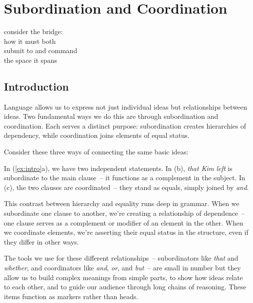 \chapter{Subordination and Coordination} \label{ch:subord-coord}

\epigraph{consider the bridge:\\
how it must both\\
submit to and command\\
the space it spans}{}

\section{Introduction}

Language allows us to express not just individual ideas but relationships between ideas. Two fundamental ways we do this are through subordination and coordination. Each serves a distinct purpose: subordination creates hierarchies of dependency, while coordination joins elements of equal status.

Consider these three ways of connecting the same basic ideas:

\ea \label{ex:intro}
    \z
\z

In (\ref{ex:intro}a), we have two independent statements. In (b), \textit{that Kim left} is subordinate to the main clause~-- it functions as a complement in the subject. In (c), the two clauses are coordinated~-- they stand as equals, simply joined by \textit{and}.

This contrast between hierarchy and equality runs deep in grammar. When we subordinate one clause to another, we're creating a relationship of dependence~-- one clause serves as a complement or modifier of an element in the other. When we coordinate elements, we're asserting their equal status in the structure, even if they differ in other ways.

The tools we use for these different relationships~-- subordinators like \textit{that} and \textit{whether}, and coordinators like \textit{and}, \textit{or}, and \textit{but}~-- are small in number but they allow us to build complex meanings from simple parts, to show how ideas relate to each other, and to guide our audience through long chains of reasoning. These items function as markers rather than heads.

